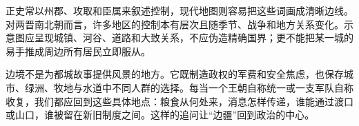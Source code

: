 \begin{debate}[疆界能画得多精确]
正史常以州郡、攻取和臣属来叙述控制，现代地图则容易把这些词画成清晰边线。对两晋南北朝而言，许多地区的控制本有层次且随季节、战争和地方关系变化。示意图应呈现城镇、河谷、道路和大致关系，不应伪造精确国界；更不能把某一城的易手推成周边所有居民立即服从。
\end{debate}

边境不是为都城故事提供风景的地方。它既制造政权的军费和安全焦虑，也保存城市、绿洲、牧地与水道中不同人群的选择。每当一个王朝自称统一或一支军队自称收复，我们都应回到这些具体地点：粮食从何处来，消息怎样传递，谁能通过渡口或山口，谁被留在新旧制度之间。这样的追问让“边疆”回到政治的中心。
